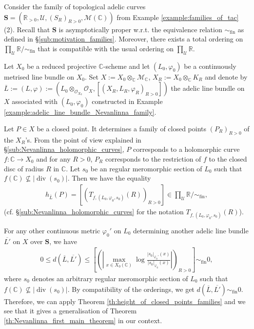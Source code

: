 \documentclass [11pt,reqno]{amsart}
\def\bC{{\mathbb{C}}}
\def\bR{{\mathbb{R}}}
\newcommand{\1}{\mathmybb{1}}
\def\cM{{\mathcal{M}}}
\def\cO{{\mathcal{O}}}
\def\cU{{\mathcal{U}}}
\def\div{\operatorname{div}}
\def\fin{\mathrm{fin}}
\begin{document}
\begin{example}
\label{example:height_of_closed_points_Nevanlinna}
Consider the family of topological adelic curves $\mathbf{S}=(\bR_{>0},\cU,(S_{R})_{R>0},\cM(\bC))$ from Example \ref{example:families_of_tac} (2). Recall that $\mathbf{S}$ is asymptotically proper w.r.t. the equivalence relation $\sim_{\fin}$ as defined in \S \ref{sub:motivation_families}. Moreover, there exists a total ordering on $\prod_{\cU}\bR/\sim_{\fin}$ that is compatible with the usual ordering on $\prod_{\cU}\bR$.

Let $X_{0}$ be a reduced projective $\bC$-scheme and let $(L_{0},\varphi_{0})$ be a continuously metrised line bundle on $X_{0}$. Set $X:=X_{0}\otimes_{\bC}\cM_{\bC}$, $X_{R}:=X_{0}\otimes_{\bC}K_{R}$ and denote by $\overline{L}:=(L,\varphi):=(L_{0}\otimes_{\cO_{X_{0}}}\cO_{X},[(X_{R},L_{R},\varphi_{R})_{R>0}])$ the adelic line bundle on $X$ associated with $(L_{0},\varphi_{0})$ constructed in Example \ref{example:adelic_line_bundle_Nevanlinna_family}.

Let $P\in X$ be a closed point. It determines a family of closed points $(P_{R})_{R>0}$ of the $X_{R}$'s. From the point of view explained in \S \ref{sub:Nevanlinna_holomorphic_curves}, $P$ corresponds to a holomorphic curve $f : \bC \to X_{0}$ and for any $R>0$, $P_{R}$ corresponds to the restriction of $f$ to the closed disc of radius $R$ in $\bC$. Let $s_{0}$ be an regular meromorphic section of $L_{0}$ such that $f(\bC) \nsubseteq |\div(s_{0})|$. Then we have the equality
\begin{align*}
h_{\overline{L}}(P)=\left[\left(T_{f,(L_{0},\varphi_{0},s_{0})}(R)\right)_{R>0}\right]\in \displaystyle\prod_{\cU}\bR/\sim_{\fin},
\end{align*}
(cf. \S \ref{sub:Nevanlinna_holomorphic_curves} for the notation $T_{f,(L_{0},\varphi_{0},s_{0})}(R)$).

For any other continuous metric $\varphi_{0}'$ on $L_{0}$ determining another adelic line bundle $\overline{L'}$ on $X$ over $\mathbf{S}$, we have
\begin{align*}
0 \leq d(\overline{L},\overline{L'}) \leq \left[\left(\left|\displaystyle\max_{x\in X_{0}(\bC)} \log\frac{|s_{0}|_{\varphi_{0}'}(x)}{|s_{0}|_{\varphi_{0}}(x)}\right|\right)_{R>0}\right] \sim_{\fin} 0,
\end{align*}
where $s_{0}$ denotes an arbitrary regular meromorphic section of $L_{0}$ such that $f(\bC)\nsubseteq |\div(s_{0})|$. By compatibility of the orderings, we get $d(\overline{L},\overline{L'}) \sim_{\fin} 0$. Therefore, we can apply Theorem \ref{th:height_of_closed_points_families} and we see that it gives a generalisation of Theorem \ref{th:Nevanlinna_first_main_theorem} in our context. 


\end{example}
\end{document}
